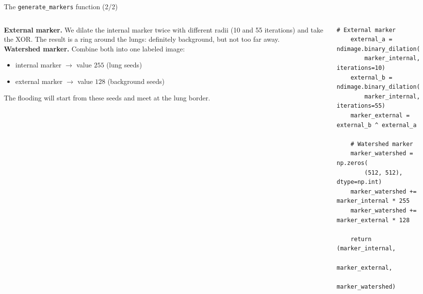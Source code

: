 \documentclass[10pt,aspectratio=169]{beamer}
\begin{document}
\begin{frame}[fragile]{The \texttt{generate\_markers} function (2/2)}
\begin{columns}[T,onlytextwidth]
\begin{column}{0.42\textwidth}
\small
\textbf{External marker.} We dilate the internal marker twice with different radii (10 and 55 iterations) and take the XOR. The result is a ring around the lungs: definitely background, but not too far away.\\[0.4em]
\textbf{Watershed marker.} Combine both into one labeled image:
\begin{itemize}
  \item internal marker $\to$ value $255$ (lung seeds)
  \item external marker $\to$ value $128$ (background seeds)
\end{itemize}
The flooding will start from these seeds and meet at the lung border.
\end{column}
\begin{column}{0.56\textwidth}
\begin{lstlisting}[firstnumber=last]
    # External marker
    external_a = ndimage.binary_dilation(
        marker_internal, iterations=10)
    external_b = ndimage.binary_dilation(
        marker_internal, iterations=55)
    marker_external = external_b ^ external_a

    # Watershed marker
    marker_watershed = np.zeros(
        (512, 512), dtype=np.int)
    marker_watershed += marker_internal * 255
    marker_watershed += marker_external * 128

    return (marker_internal,
            marker_external,
            marker_watershed)
\end{lstlisting}
\end{column}
\end{columns}
\end{frame}
\end{document}
